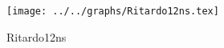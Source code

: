 \begin{figure}[h] \centering \texttt{[image: ../../graphs/Ritardo12ns.tex]}\caption{Ritardo12ns}\label{gr:Ritardo12ns} \end{figure}
